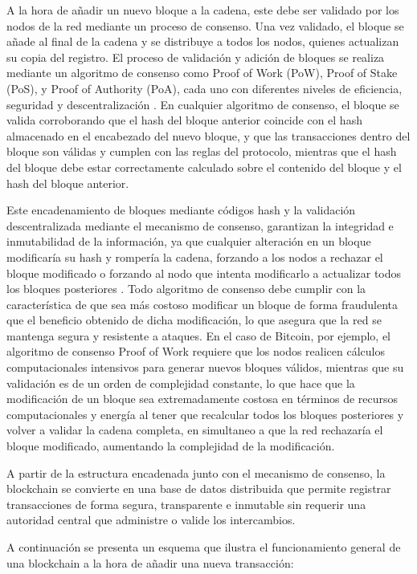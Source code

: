 A la hora de añadir un nuevo bloque a la cadena, este debe ser validado por los nodos de la red mediante un proceso de consenso. Una vez validado, el bloque se añade al final de la cadena y se distribuye a todos los nodos, quienes actualizan su copia del registro. El proceso de validación y adición de bloques se realiza mediante un algoritmo de consenso como Proof of Work (PoW), Proof of Stake (PoS), y Proof of Authority (PoA), cada uno con diferentes niveles de eficiencia, seguridad y descentralización \cite{diaz2022protocolos}. En cualquier algoritmo de consenso, el bloque se valida corroborando que el hash del bloque anterior coincide con el hash almacenado en el encabezado del nuevo bloque, y que las transacciones dentro del bloque son válidas y cumplen con las reglas del protocolo, mientras que el hash del bloque debe estar correctamente calculado sobre el contenido del bloque y el hash del bloque anterior.

Este encadenamiento de bloques mediante códigos hash y la validación descentralizada mediante el mecanismo de consenso, garantizan la integridad e inmutabilidad de la información, ya que cualquier alteración en un bloque modificaría su hash y rompería la cadena, forzando a los nodos a rechazar el bloque modificado o forzando al nodo que intenta modificarlo a actualizar todos los bloques posteriores  \cite{farhana2022blockchain}. Todo algoritmo de consenso debe cumplir con la característica de que sea más costoso modificar un bloque de forma fraudulenta que el beneficio obtenido de dicha modificación, lo que asegura que la red se mantenga segura y resistente a ataques. En el caso de Bitcoin, por ejemplo, el algoritmo de consenso Proof of Work requiere que los nodos realicen cálculos computacionales intensivos para generar nuevos bloques válidos, mientras que su validación es de un orden de complejidad constante, lo que hace que la modificación de un bloque sea extremadamente costosa en términos de recursos computacionales y energía al tener que recalcular todos los bloques posteriores y volver a validar la cadena completa, en simultaneo a que la red rechazaría el bloque modificado, aumentando la complejidad de la modificación.

A partir de la estructura encadenada junto con el mecanismo de consenso, la blockchain se convierte en una base de datos distribuida que permite registrar transacciones de forma segura, transparente e inmutable sin requerir una autoridad central que administre o valide los intercambios.

A continuación se presenta un esquema que ilustra el funcionamiento general de una blockchain a la hora de añadir una nueva transacción:

